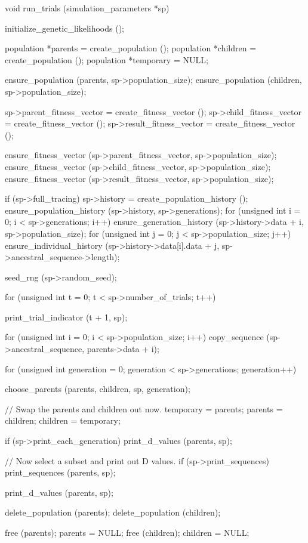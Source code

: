 \documentclass{article}
\begin{document}
\begin{ccode}
void run_trials (simulation_parameters *sp) {
  initialize_genetic_likelihoods ();

  population *parents = create_population ();
  population *children = create_population ();
  population *temporary = NULL;

  ensure_population (parents, sp->population_size);
  ensure_population (children, sp->population_size);

  sp->parent_fitness_vector = create_fitness_vector ();
  sp->child_fitness_vector = create_fitness_vector ();
  sp->result_fitness_vector = create_fitness_vector ();

  ensure_fitness_vector (sp->parent_fitness_vector, sp->population_size);
  ensure_fitness_vector (sp->child_fitness_vector, sp->population_size);
  ensure_fitness_vector (sp->result_fitness_vector, sp->population_size);

  if (sp->full_tracing) {
    sp->history = create_population_history ();
    ensure_population_history (sp->history, sp->generations);
    for (unsigned int i = 0; i < sp->generations; i++) {
      ensure_generation_history (sp->history->data + i, sp->population_size);
      for (unsigned int j = 0; j < sp->population_size; j++)
       ensure_individual_history (sp->history->data[i].data + j, sp->ancestral_sequence->length);
    }
  }

  seed_rng (sp->random_seed);

  for (unsigned int t = 0; t < sp->number_of_trials; t++) {
    print_trial_indicator (t + 1, sp);

    for (unsigned int i = 0; i < sp->population_size; i++)
      copy_sequence (sp->ancestral_sequence, parents->data + i);

    for (unsigned int generation = 0; generation < sp->generations; generation++) {
      choose_parents (parents, children, sp, generation);

      // Swap the parents and children out now.
      temporary = parents;
      parents = children;
      children = temporary;

      if (sp->print_each_generation)
       print_d_values (parents, sp);
    }

    // Now select a subset and print out D values.
    if (sp->print_sequences)
      print_sequences (parents, sp);

    print_d_values (parents, sp);
  }

  delete_population (parents);
  delete_population (children);

  free (parents); parents = NULL;
  free (children); children = NULL;
}
\end{ccode}
\end{document}

